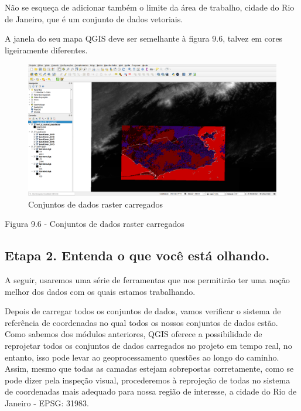 \documentclass[
  portuguese,
]{krantz}
\begin{document}
Não se esqueça de adicionar também o limite da área de trabalho, cidade do Rio de Janeiro, que é um conjunto de dados vetoriais.

A janela do seu mapa QGIS deve ser semelhante à figura 9.6, talvez em cores ligeiramente diferentes.

\begin{figure}
\centering
\includegraphics{media/modulo9/fig96.png}
\caption{Conjuntos de dados raster carregados}
\end{figure}

Figura 9.6 - Conjuntos de dados raster carregados

\hypertarget{etapa-2.-entenda-o-que-vocuxea-estuxe1-olhando.-1}{%
\subsection{\texorpdfstring{\textbf{Etapa 2. Entenda o que você está olhando.}}{Etapa 2. Entenda o que você está olhando.}}\label{etapa-2.-entenda-o-que-vocuxea-estuxe1-olhando.-1}}

A seguir, usaremos uma série de ferramentas que nos permitirão ter uma noção melhor dos dados com os quais estamos trabalhando.

Depois de carregar todos os conjuntos de dados, vamos verificar o sistema de referência de coordenadas no qual todos os nossos conjuntos de dados estão. Como sabemos dos módulos anteriores, QGIS oferece a possibilidade de reprojetar todos os conjuntos de dados carregados no projeto em tempo real, no entanto, isso pode levar ao geoprocessamento questões ao longo do caminho. Assim, mesmo que todas as camadas estejam sobrepostas corretamente, como se pode dizer pela inspeção visual, procederemos à reprojeção de todas no sistema de coordenadas mais adequado para nossa região de interesse, a cidade do Rio de Janeiro - EPSG: 31983.
\end{document}
